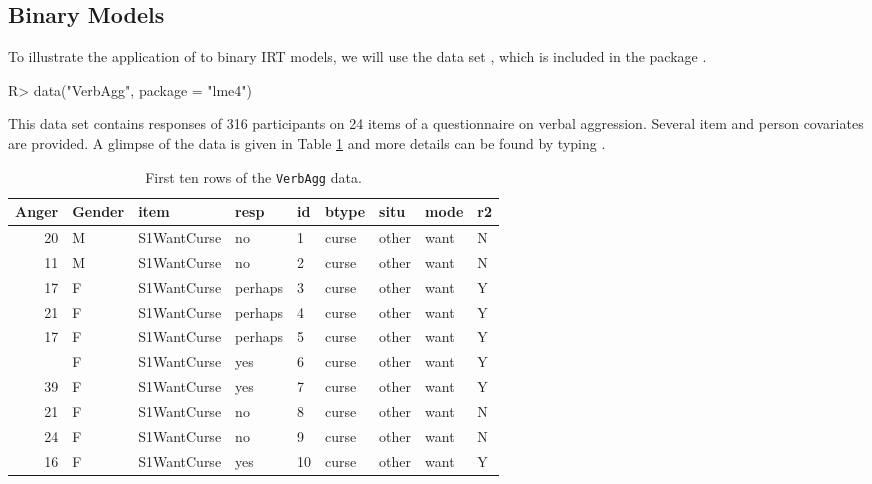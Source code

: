 \documentclass[jss]{jss}
\begin{document}
\hypertarget{binary}{%
\subsection{Binary Models}\label{binary}}

To illustrate the application of  to binary IRT models, we
will use the  data set \citep{deboeck2004}, which is
included in the  package \citep{lme4}.

\begin{CodeChunk}

\begin{CodeInput}
R> data("VerbAgg", package = "lme4")
\end{CodeInput}
\end{CodeChunk}

This data set contains responses of 316 participants on 24 items of a
questionnaire on verbal aggression. Several item and person covariates
are provided. A glimpse of the data is given in Table
\ref{tab:head-VerbAgg} and more details can be found by typing
.

\begin{CodeChunk}
\begin{table}

\caption{\label{tab:head-VerbAgg}First ten rows of the \texttt{VerbAgg} data.}
\centering
\begin{tabular}[t]{rllllllll}
\toprule
Anger & Gender & item & resp & id & btype & situ & mode & r2\\
\midrule
20 & M & S1WantCurse & no & 1 & curse & other & want & N\\
11 & M & S1WantCurse & no & 2 & curse & other & want & N\\
17 & F & S1WantCurse & perhaps & 3 & curse & other & want & Y\\
21 & F & S1WantCurse & perhaps & 4 & curse & other & want & Y\\
17 & F & S1WantCurse & perhaps & 5 & curse & other & want & Y\\
\addlinespace
21 & F & S1WantCurse & yes & 6 & curse & other & want & Y\\
39 & F & S1WantCurse & yes & 7 & curse & other & want & Y\\
21 & F & S1WantCurse & no & 8 & curse & other & want & N\\
24 & F & S1WantCurse & no & 9 & curse & other & want & N\\
16 & F & S1WantCurse & yes & 10 & curse & other & want & Y\\
\bottomrule
\end{tabular}
\end{table}

\end{CodeChunk}
\end{document}
